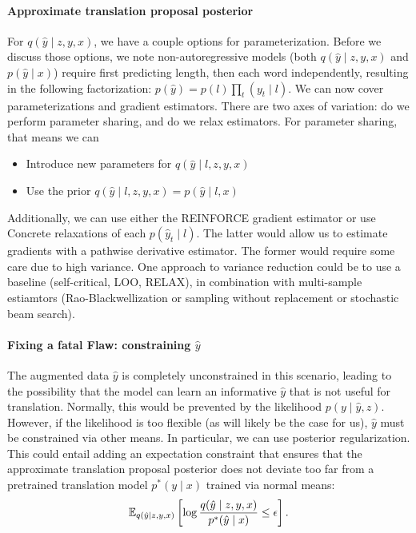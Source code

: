 \documentclass[11pt]{article}
\begin{document}
\paragraph{Approximate translation proposal posterior}
For $q(\hat{y} \mid z, y, x)$, we have a couple options for parameterization.
Before we discuss those options, we note non-autoregressive models (both $q(\hat{y}\mid z,y,x)$
and $p(\hat{y} \mid x)$) require first predicting length, then each word independently,
resulting in the following factorization: $p(\hat{y}) = p(l)\prod_t(y_t \mid l)$.
We can now cover parameterizations and gradient estimators.
There are two axes of variation: do we perform parameter sharing,
and do we relax estimators.
For parameter sharing, that means we can
\begin{itemize}
\item Introduce new parameters for $q(\hat{y} \mid l, z, y, x)$
\item Use the prior $q(\hat{y} \mid l, z, y, x) = p(\hat{y} \mid l, x)$
\end{itemize}
Additionally, we can use either the REINFORCE gradient estimator or
use Concrete relaxations of each $p(\hat{y}_t \mid l)$.
The latter would allow us to estimate gradients with a pathwise derivative estimator.
The former would require some care due to high variance.
One approach to variance reduction could be to use a baseline (self-critical, LOO, RELAX),
in combination with multi-sample estiamtors
(Rao-Blackwellization or sampling without replacement or stochastic beam search).

\paragraph{Fixing a fatal Flaw: constraining $\hat{y}$}
The augmented data $\hat{y}$ is completely unconstrained in this scenario,
leading to the possibility that the model can learn an informative $\hat{y}$
that is not useful for translation.
Normally, this would be prevented by the likelihood $p(y \mid \hat{y},z)$.
However, if the likelihood is too flexible (as will likely be the case for us),
$\hat{y}$ must be constrained via other means.
In particular, we can use posterior regularization.
This could entail adding an expectation constraint that ensures that the
approximate translation proposal posterior does not deviate too far from a pretrained
translation model $p^*(y \mid x)$ trained via normal means:
$$\mathbb{E}_{q(\hat{y} \mid z, y, x)}\left[ \log \frac{q(\hat{y} \mid z, y, x)}{p^*(\hat{y} \mid x)} \le \epsilon\right].$$
\end{document}
